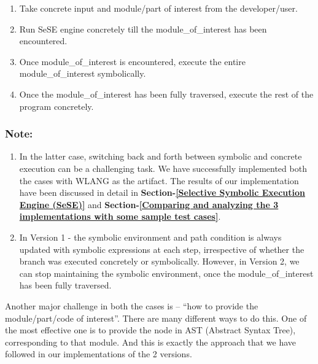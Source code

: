 \documentclass[11pt]{llncs}
\begin{document}
\begin{itemize}
\begin{algorithm}[H]
					\;
		
					\begin{enumerate}
						\item Take concrete input and module/part of interest from the developer/user.
						\item Run SeSE engine concretely till the module\_of\_interest has been encountered.
						\item Once module\_of\_interest is encountered, execute the entire module\_of\_interest symbolically.
						\item Once the module\_of\_interest has been fully traversed, execute the rest of the program concretely.
					\end{enumerate}
				\end{algorithm}
		\end{itemize}
		

		\subsubsection{Note:}
			\begin{enumerate}
				\item In the latter case, switching back and forth between symbolic and concrete execution can be a challenging task. We have successfully implemented both the cases with WLANG as the artifact. The results of our implementation have been discussed in detail in \textbf{Section-\ref{Selective Symbolic Execution Engine (SeSE)}} and \textbf{Section-\ref{Comparing and analyzing the 3 implementations with some sample test cases}}.
				\item In Version 1 - the symbolic environment and path condition is always updated with symbolic expressions at each step, irrespective of whether the branch was executed concretely or symbolically. However, in Version 2, we can stop maintaining the symbolic environment, once the module\_of\_interest has been fully traversed.
			\end{enumerate}

		Another major challenge in both the cases is – “how to provide the module/part/code of interest”. There are many different ways to do this. One of the most effective one is to provide the node in AST (Abstract Syntax Tree), corresponding to that module. And this is exactly the approach that we have followed in our implementations of the 2 versions.
\end{document}
